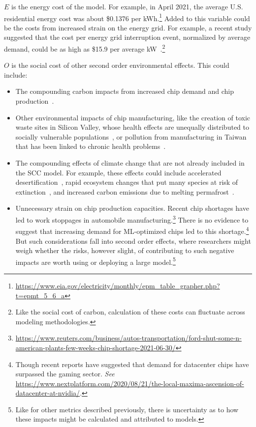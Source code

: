 $E$ is the energy cost of the model. For example, in April 2021, the average U.S. residential energy cost was about \$0.1376 per kWh.\footnote{\url{https://www.eia.gov/electricity/monthly/epm_table_grapher.php?t=epmt_5_6_a}} Added to this variable could be the costs from increased strain on the energy grid. For example, a recent study suggested that the cost per energy grid interruption event, normalized by average demand, could be as high as \$15.9 per average kW~\citep{sullivan_updated_2015}.\footnote{Like the social cost of carbon, calculation of these costs can fluctuate across modeling methodologies.}

$O$ is the social cost of other second order environmental effects. This could include:

\begin{itemize}
    \item The compounding carbon impacts from increased chip demand and chip production~\citep{gupta2021chasing}.
    \item Other environmental impacts of chip manufacturing, like the creation of toxic waste sites in Silicon Valley, whose health effects are unequally distributed to socially vulnerable populations~\citep{stewart2014uneven}, or pollution from manufacturing in Taiwan that has been linked to chronic health problems~\citep{tu2009ineffective,lin2016increased}. 
 \item The compounding effects of climate change that are not already included in the SCC model. For example, these effects could include accelerated desertification~\cite{huang_accelerated_2016}, rapid ecosystem changes that put many species at risk of extinction~\cite{urban_accelerating_2015}, and increased carbon emissions due to melting permafrost~\citep{schuur_climate_2015}. 
 \item Unnecessary strain on chip production capacities. Recent chip shortages have led to work stoppages in automobile manufacturing.\footnote{\url{https://www.reuters.com/business/autos-transportation/ford-shut-some-n-american-plants-few-weeks-chip-shortage-2021-06-30/}} There is no evidence to suggest that increasing demand for ML-optimized chips led to this shortage.\footnote{Though recent reports have suggested that demand for datacenter chips have surpassed the gaming sector. \emph{See} \href{https://www.nextplatform.com/2020/08/21/the-local-maxima-ascension-of-datacenter-at-nvidia/}{https://www.nextplatform.com/2020/08/21/the-local-maxima-ascension-of-datacenter-at-nvidia/}.}
 But such considerations fall into second order effects, where researchers might weigh whether the risks, however slight, of contributing to such negative impacts are worth using or deploying a large model.\footnote{Like for other metrics described previously, there is uncertainty as to how these impacts might be calculated and attributed to models.}
\end{itemize}


